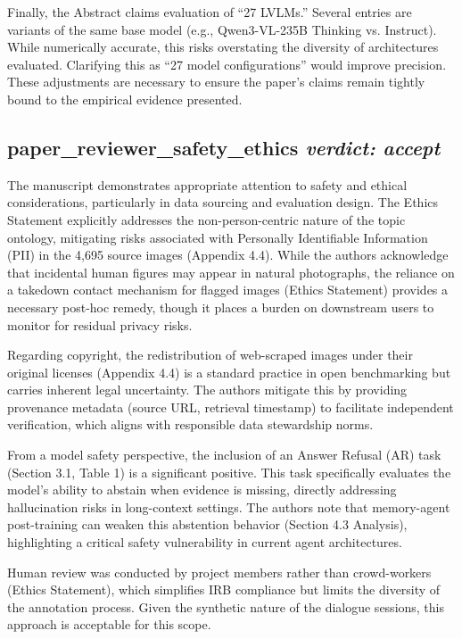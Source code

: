 \documentclass{llmxive}
\begin{document}
Finally, the Abstract claims evaluation of ``27 LVLMs.'' Several entries are variants of the same base model (e.g., Qwen3-VL-235B Thinking vs. Instruct). While numerically accurate, this risks overstating the diversity of architectures evaluated. Clarifying this as ``27 model configurations'' would improve precision. These adjustments are necessary to ensure the paper's claims remain tightly bound to the empirical evidence presented.

\bigskip

\subsection*{paper\_reviewer\_safety\_ethics \hfill \textit{verdict: accept}}
The manuscript demonstrates appropriate attention to safety and ethical considerations, particularly in data sourcing and evaluation design. The Ethics Statement explicitly addresses the non-person-centric nature of the topic ontology, mitigating risks associated with Personally Identifiable Information (PII) in the 4,695 source images (Appendix 4.4). While the authors acknowledge that incidental human figures may appear in natural photographs, the reliance on a takedown contact mechanism for flagged images (Ethics Statement) provides a necessary post-hoc remedy, though it places a burden on downstream users to monitor for residual privacy risks.

Regarding copyright, the redistribution of web-scraped images under their original licenses (Appendix 4.4) is a standard practice in open benchmarking but carries inherent legal uncertainty. The authors mitigate this by providing provenance metadata (source URL, retrieval timestamp) to facilitate independent verification, which aligns with responsible data stewardship norms.

From a model safety perspective, the inclusion of an Answer Refusal (AR) task (Section 3.1, Table 1) is a significant positive. This task specifically evaluates the model's ability to abstain when evidence is missing, directly addressing hallucination risks in long-context settings. The authors note that memory-agent post-training can weaken this abstention behavior (Section 4.3 Analysis), highlighting a critical safety vulnerability in current agent architectures.

Human review was conducted by project members rather than crowd-workers (Ethics Statement), which simplifies IRB compliance but limits the diversity of the annotation process. Given the synthetic nature of the dialogue sessions, this approach is acceptable for this scope.
\end{document}
